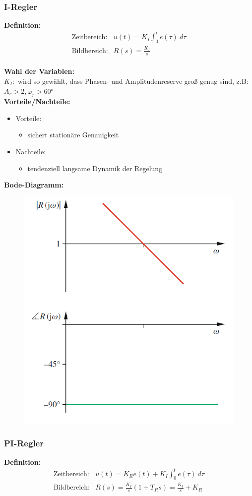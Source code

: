 \documentclass[10pt,a4paper]{article}
\begin{document}
\subsubsection{I-Regler}
\textbf{Definition:}
$$
	\begin{array}{ll}
	\text{Zeitbereich:} & u(t) = K_I \int_0^t e(\tau) ~d\tau \\
	\text{Bildbereich:} & R(s) = \frac{K_I}{s}
	\end{array}
$$ \\

\textbf{Wahl der Variablen:} \\
$K_I:$ wird so gewählt, dass Phasen- und Amplitudenreserve groß genug sind, z.B: $A_r > 2, \varphi_r > 60°$ \\

\textbf{Vorteile/Nachteile:}
\begin{itemize}
	\item Vorteile:
	\begin{itemize}
		\item sichert stationäre Genauigkeit
	\end{itemize}
	\item Nachteile:
	\begin{itemize}
		\item tendenziell langsame Dynamik der Regelung
	\end{itemize}
\end{itemize}

\textbf{Bode-Diagramm:}
\begin{figure}[H]
	\includegraphics[width = 0.4\columnwidth]{imgs/i-regler.png}
\end{figure}

\subsubsection{PI-Regler}
\textbf{Definition:}
$$
	\begin{array}{ll}
	\text{Zeitbereich:} & u(t) = K_R e(t) + K_I \int_0^t e(\tau) ~d\tau \\
	\text{Bildbereich:} & R(s) = \frac{K_I}{s} (1 + T_R s) = \frac{K_I}{s} + K_R
	\end{array}
$$ \\
\end{document}
